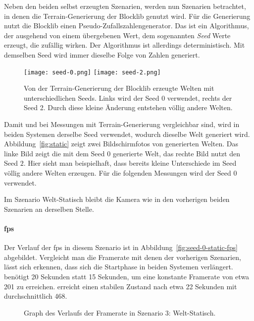 Neben den beiden selbst erzeugten Szenarien, werden nun Szenarien betrachtet, in denen die Terrain-Generierung der Blocklib genutzt wird. Für die Generierung nutzt die Blocklib einen Pseudo-Zufallszahlengenerator. Das ist ein Algorithmus, der ausgehend von einem übergebenen Wert, dem sogenannten \emph{Seed} Werte erzeugt, die zufällig wirken. Der Algorithmus ist allerdings deterministisch. Mit demselben Seed wird immer dieselbe Folge von Zahlen generiert.

\begin{figure}
	\centering
	\texttt{[image: seed-0.png]}
	\hfill
	\texttt{[image: seed-2.png]}
	\caption[Von der Terrain-Generierung der Blocklib erzeugte Welten mit unterschiedlichen Seeds.]{Von der Terrain-Generierung der Blocklib erzeugte Welten mit unterschiedlichen Seeds. Links wird der Seed 0 verwendet, rechts der Seed 2. Durch diese kleine Änderung entstehen völlig andere Welten.}\label{fig:static}
\end{figure}
Damit \sysA{} und \sysB{} bei Messungen mit Terrain-Generierung vergleichbar sind, wird in beiden Systemen derselbe Seed verwendet, wodurch dieselbe Welt generiert wird. Abbildung~\vref{fig:static} zeigt zwei Bildschirmfotos von generierten Welten. Das linke Bild zeigt die mit dem Seed $0$ generierte Welt, das rechte Bild nutzt den Seed $2$. Hier sieht man beispielhaft, dass bereits kleine Unterschiede im Seed völlig andere Welten erzeugen. Für die folgenden Messungen wird der Seed $0$ verwendet. 

Im Szenario Welt-Statisch bleibt die Kamera wie in den vorherigen beiden Szenarien an derselben Stelle.



\paragraph{\ac{fps}}

Der Verlauf der \ac{fps} in diesem Szenario ist in Abbildung~\vref{fig:seed-0-static-fps} abgebildet. Vergleicht man die Framerate mit denen der vorherigen Szenarien, lässt sich erkennen, dass sich die Startphase in beiden Systemen verlängert. \sysA{} benötigt 20 Sekunden statt 15 Sekunden, um eine konstante Framerate von etwa \SI{201}{\fps} zu erreichen. \sysB{} erreicht einen stabilen Zustand nach etwa 22 Sekunden mit durchschnittlich \SI{468}{\fps}.

\begin{figure}[!htbp]
	\caption{Graph des Verlaufs der Framerate in Szenario 3: Welt-Statisch.}\label{fig:seed-0-static-fps}
\end{figure}

